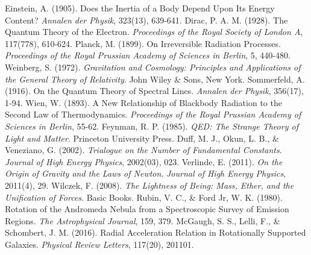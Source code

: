\documentclass[12pt,a4paper]{article}
\begin{document}
\begin{thebibliography}{99}
		 Einstein, A. (1905). Does the Inertia of a Body Depend Upon Its Energy Content? \textit{Annalen der Physik}, 323(13), 639-641.
		 Dirac, P. A. M. (1928). The Quantum Theory of the Electron. \textit{Proceedings of the Royal Society of London A}, 117(778), 610-624.
		 Planck, M. (1899). On Irreversible Radiation Processes. \textit{Proceedings of the Royal Prussian Academy of Sciences in Berlin}, 5, 440-480.
		 Weinberg, S. (1972). \textit{Gravitation and Cosmology: Principles and Applications of the General Theory of Relativity}. John Wiley \& Sons, New York.
		 Sommerfeld, A. (1916). On the Quantum Theory of Spectral Lines. \textit{Annalen der Physik}, 356(17), 1-94.
		 Wien, W. (1893). A New Relationship of Blackbody Radiation to the Second Law of Thermodynamics. \textit{Proceedings of the Royal Prussian Academy of Sciences in Berlin}, 55-62.
		 Feynman, R. P. (1985). \textit{QED: The Strange Theory of Light and Matter}. Princeton University Press.
		 Duff, M. J., Okun, L. B., \& Veneziano, G. (2002). \textit{Trialogue on the Number of Fundamental Constants}. \textit{Journal of High Energy Physics}, 2002(03), 023.
		 Verlinde, E. (2011). \textit{On the Origin of Gravity and the Laws of Newton}. \textit{Journal of High Energy Physics}, 2011(4), 29.
		 Wilczek, F. (2008). \textit{The Lightness of Being: Mass, Ether, and the Unification of Forces}. Basic Books.
		 Rubin, V. C., \& Ford Jr, W. K. (1980). Rotation of the Andromeda Nebula from a Spectroscopic Survey of Emission Regions. \textit{The Astrophysical Journal}, 159, 379.
		 McGaugh, S. S., Lelli, F., \& Schombert, J. M. (2016). Radial Acceleration Relation in Rotationally Supported Galaxies. \textit{Physical Review Letters}, 117(20), 201101.
	\end{thebibliography}
	
	
\end{document}
